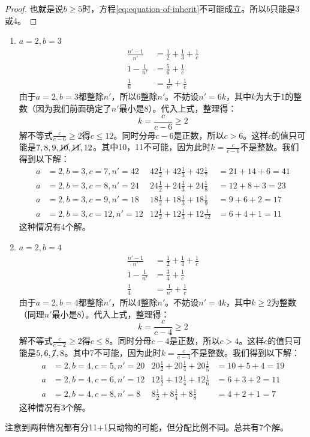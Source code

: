 \documentclass[b5paper]{ctexart}
\begin{document}
\begin{Answer}[ref={ex:fractions}]
{\begin{proof}
也就是说$b \geq 5$时，方程\cref{eq:equation-of-inherit}不可能成立。所以$b$只能是3或4。
\end{proof}

\begin{enumerate}[情况1)]
\item $a = 2, b = 3$
  \begin{align*}
    \frac{n'-1}{n'} &= \frac{1}{2} + \frac{1}{3} + \frac{1}{c} \\
    1 - \frac{1}{n'} &= \frac{5}{6} + \frac{1}{c} \\
    \frac{1}{6} &= \frac{1}{n'} + \frac{1}{c}
  \end{align*}
  由于$a = 2, b = 3$都整除$n'$，所以6整除$n'$。不妨设$n' = 6k$，其中$k$为大于1的整数（因为我们前面确定了$n'$最小是8）。代入上式，整理得：
  \[
  k = \frac{c}{c - 6} \geq 2
  \]
  解不等式$\frac{c}{c - 6} \geq 2$得$c \leq 12$。同时分母$c-6$是正数，所以$c > 6$。这样$c$的值只可能是$7, 8, 9, \cancel{10}, \cancel{11}, 12$。其中10，11不可能，因为此时$k = \frac{c}{c - 6}$不是整数。我们得到以下解：
  \begin{align*}
  a &= 2, b = 3, c = 7, n' = 42 & 42\frac{1}{2} + 42\frac{1}{3} + 42\frac{1}{7} &= 21 + 14 + 6 = 41 \\
  a &= 2, b = 3, c = 8, n' = 24 & 24\frac{1}{2} + 24\frac{1}{3} + 24\frac{1}{8} &= 12 + 8 + 3 = 23 \\
  a &= 2, b = 3, c = 9, n' = 18 & 18\frac{1}{2} + 18\frac{1}{3} + 18\frac{1}{9} &= 9 + 6 + 2 = 17 \\
  a &= 2, b = 3, c = 12, n' = 12 & 12\frac{1}{2} + 12\frac{1}{3} + 12\frac{1}{12} &= 6 + 4 + 1 = 11
  \end{align*}
  这种情况有4个解。
\item $a = 2, b = 4$
  \begin{align*}
    \frac{n'-1}{n'} &= \frac{1}{2} + \frac{1}{4} + \frac{1}{c} \\
    1 - \frac{1}{n'} &= \frac{3}{4} + \frac{1}{c} \\
    \frac{1}{4} &= \frac{1}{n'} + \frac{1}{c}
  \end{align*}
  由于$a = 2, b = 4$都整除$n'$，所以4整除$n'$。不妨设$n' = 4k$，其中$k \geq 2 $为整数（同理$n'$最小是8）。代入上式，整理得：
  \[
  k = \frac{c}{c - 4} \geq 2
  \]
  解不等式$\frac{c}{c - 2} \geq 2$得$c \leq 8$。同时分母$c-4$是正数，所以$c > 4$。这样$c$的值只可能是$5, 6, \cancel{7}, 8$。其中7不可能，因为此时$k = \frac{c}{c - 4}$不是整数。我们得到以下解：
  \begin{align*}
  a &= 2, b = 4, c = 5, n' = 20 & 20\frac{1}{2} + 20\frac{1}{4} + 20\frac{1}{5} &= 10 + 5 + 4 = 19 \\
  a &= 2, b = 4, c = 6, n' = 12 & 12\frac{1}{2} + 12\frac{1}{4} + 12\frac{1}{6} &= 6 + 3 + 2 = 11 \\
  a &= 2, b = 4, c = 8, n' = 8 & 8\frac{1}{2} + 8\frac{1}{4} + 8\frac{1}{8} &= 4 + 2 + 1 = 7
  \end{align*}
  这种情况有3个解。
\end{enumerate}
注意到两种情况都有分11+1只动物的可能，但分配比例不同。总共有7个解。
}


\end{Answer}
\end{document}

